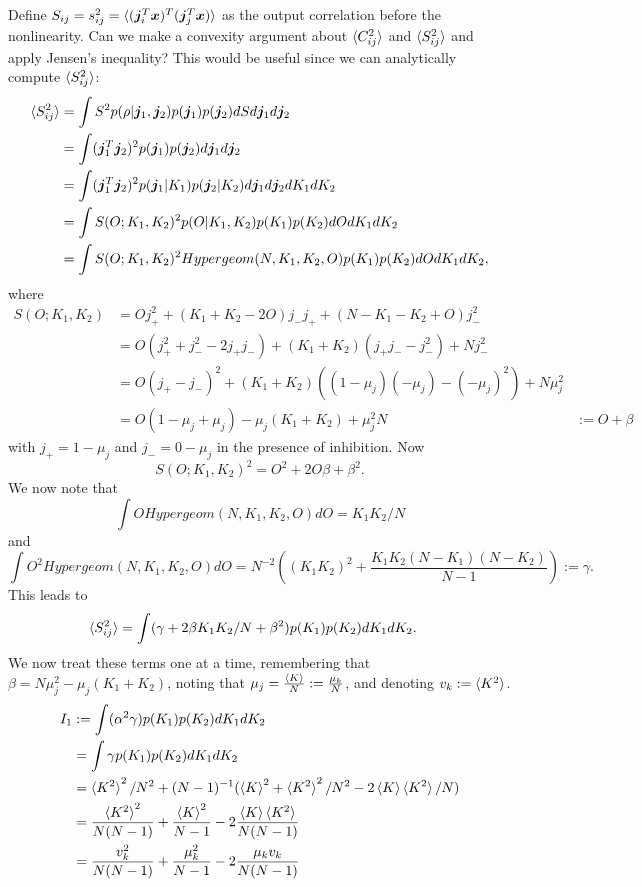 \documentclass{article}
\renewcommand\b\bm
\begin{document}
Define $S_{ij} = s_{ij}^2 = \braket{(\b{j}_i^T \b{x})^T (\b{j}_j^T \b{x})}$ as the output correlation before the nonlinearity.
Can we make a convexity argument about $\braket{C_{ij}^2}$ and $\braket{S_{ij}^2}$ and apply Jensen's inequality?
This would be useful since we can analytically compute $\braket{S_{ij}^2}$:
\begin{align}
    \braket{S_{ij}^2} &= \int S^2 p(\rho|\b{j}_1, \b{j}_2) p(\b{j}_1) p(\b{j}_2) dS d\b{j}_1 d\b{j}_2\\
    &= \int (\b{j}_1^T \b{j}_2)^2 p(\b{j}_1) p(\b{j}_2) d\b{j}_1 d\b{j}_2\\
    &= \int (\b{j}_1^T \b{j}_2)^2 p(\b{j}_1|K_1) p(\b{j}_2|K_2) d\b{j}_1 d\b{j}_2 dK_1 dK_2\\
    &= \int S(O; K_1, K_2)^2 p(O|K_1, K_2) p(K_1) p(K_2) dO dK_1 dK_2\\
    &= \int S(O; K_1, K_2)^2 Hypergeom(N, K_1, K_2, O) p(K_1) p(K_2) dO dK_1 dK_2,
\end{align}
where 
\begin{align}
    S(O; K_1, K_2) &= O j_+^2 + (K_1 + K_2 - 2O) j_- j_+ + (N - K_1 - K_2 + O) j_-^2\\
    &= O(j_+^2 + j_-^2 - 2 j_+ j_-) + (K_1 + K_2)(j_+ j_- - j_-^2)+Nj_-^2\\
    &= O (j_+ - j_-)^2 + (K_1 + K_2)((1- \mu_j)(-\mu_j) - (-\mu_j)^2) + N \mu_j^2\\
    &= O(1 - \mu_j + \mu_j) - \mu_j (K_1 + K_2) + \mu_j^2 N
    &:= O + \beta
\end{align}
with $j_+ = 1 - \mu_j$ and $j_- = 0 - \mu_j$ in the presence of inhibition.
Now
\begin{equation}
    S(O; K_1, K_2)^2 = O^2 + 2O \beta + \beta^2.
\end{equation}
We now note that
\begin{equation}
    \int O Hypergeom(N, K_1, K_2, O) dO = K_1 K_2 / N
\end{equation}
and
\begin{equation}
    \int O^2 Hypergeom(N, K_1, K_2, O) dO = 
    N^{-2} \left ( (K_1 K_2)^2 + \frac{K_1 K_2 (N-K_1) (N-K_2)}{N-1} \right ) := \gamma.
\end{equation}
This leads to
\begin{align}
    \braket{S_{ij}^2}
    &= \int (\gamma + 2\beta K_1 K_2/N + \beta^2 ) p(K_1) p(K_2) dK_1 dK_2.
\end{align}
We now treat these terms one at a time, remembering that $\beta = N \mu_j^2 - \mu_j (K_1 + K_2)$, noting that $\mu_j = \frac{\braket{K}}{N} := \frac{\mu_k}{N}$, and denoting $v_k := \braket{K^2}$.
\begin{align}
    I_1 &:= \int (\alpha^2 \gamma) p(K_1) p(K_2) dK_1 dK_2\\
    &= \int \gamma p(K_1) p(K_2) dK_1 dK_2\\
    &= \braket{K^2}^2/N^2 + (N-1)^{-1} (\braket{K}^2 + \braket{K^2}^2/N^2 - 2 \braket{K} \braket{K^2} / N)\\
    &= \frac{\braket{K^2}^2}{N (N-1)} + \frac{\braket{K}^2}{N-1} - 2 \frac{\braket{K} \braket{K^2}}{N (N-1)}\\
    &= \frac{v_k^2}{N (N-1)} + \frac{\mu_k^2}{N-1} - 2 \frac{\mu_k v_k}{N (N-1)}
\end{align}
\end{document}
